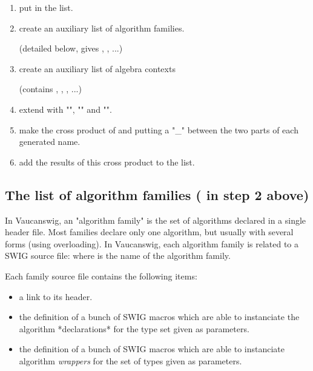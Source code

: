 \begin{enumerate}
\item put  in the  list.

\item create an auxiliary list  of algorithm families.

  (detailed below, gives , , ...)

\item create an auxiliary list  of algebra contexts

  (contains , , , ...)

\item extend  with "", ""
  and "".

\item make the cross product of  and  putting a
  "\_" between the two parts of each generated name.

\item add the results of this cross product to the 
  list.
\end{enumerate}

\subsection{The list of algorithm families ( in step 2 above)}


In Vaucanswig, an "algorithm family" is the set of algorithms declared
in a single \Vauc header file. Most families declare only one
algorithm, but usually with several forms (using overloading). In
Vaucanswig, each algorithm family is related to a SWIG source file:
 where  is the name of the
algorithm family.

Each family source file contains the following items:

\begin{itemize}
\item a link to its \Cxx header.

\item the definition of a bunch of SWIG macros which are able to
  instanciate the algorithm *declarations* for the type set given as
  parameters.

\item the definition of a bunch of SWIG macros which are able to
  instanciate algorithm \emph{wrappers} for the set of types given as
  parameters.
\end{itemize}

